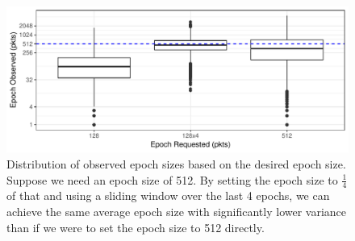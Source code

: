 \begin{figure}
    \centering
\begin{knitrout}
\color{fgcolor}
\includegraphics[width=\maxwidth]{figure/micro:epoch-1} 

\end{knitrout}
    \caption{Distribution of observed epoch sizes based on the desired epoch size. Suppose we
    need an epoch size of 512. By setting the epoch size to $\frac{1}{4}$ of that and using
    a sliding window over the last 4 epochs, we can achieve the same average epoch size with
    significantly lower variance than if we were to set the epoch size to 512 directly.
    }
    \label{fig:micro:epoch}
\end{figure}
